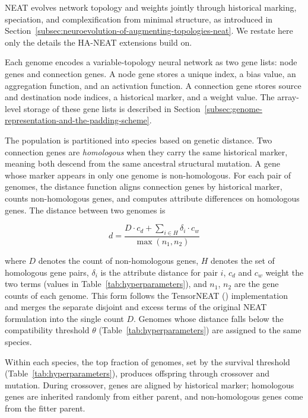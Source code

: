 \documentclass[12pt]{article}
\begin{document}
NEAT evolves network topology and weights jointly through historical marking, speciation, and complexification from minimal structure, as introduced in Section~\ref{subsec:neuroevolution-of-augmenting-topologies-neat}.
We restate here only the details the HA-NEAT extensions build on.

Each genome encodes a variable-topology neural network as two gene lists: node genes and connection genes.
A node gene stores a unique index, a bias value, an aggregation function, and an activation function.
A connection gene stores source and destination node indices, a historical marker, and a weight value.
The array-level storage of these gene lists is described in Section~\ref{subsec:genome-representation-and-the-padding-scheme}.

The population is partitioned into species based on genetic distance.
Two connection genes are \emph{homologous} when they carry the same historical marker, meaning both descend from the same ancestral structural mutation. A gene whose marker appears in only one genome is non-homologous.
For each pair of genomes, the distance function aligns connection genes by historical marker, counts non-homologous genes, and computes attribute differences on homologous genes.
The distance between two genomes is

\[d = \frac{D \cdot c_d + \sum_{i \in H} \delta_i \cdot c_w}{\max(n_1, n_2)}\]

where $D$ denotes the count of non-homologous genes, $H$ denotes the set of homologous gene pairs, $\delta_i$ is the attribute distance for pair $i$, $c_d$ and $c_w$ weight the two terms (values in Table~\ref{tab:hyperparameters}), and $n_1$, $n_2$ are the gene counts of each genome.
This form follows the TensorNEAT (\cite{wang_tensorized_2024}) implementation and merges the separate disjoint and excess terms of the original NEAT formulation into the single count $D$.
Genomes whose distance falls below the compatibility threshold $\theta$ (Table~\ref{tab:hyperparameters}) are assigned to the same species.

Within each species, the top fraction of genomes, set by the survival threshold (Table~\ref{tab:hyperparameters}), produces offspring through crossover and mutation.
During crossover, genes are aligned by historical marker; homologous genes are inherited randomly from either parent, and non-homologous genes come from the fitter parent.

\end{document}
